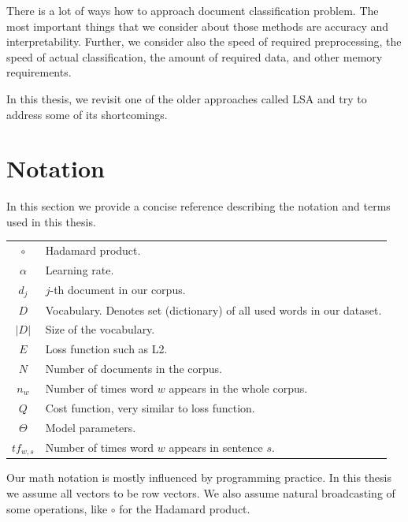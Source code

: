     There is a lot of ways how to approach document classification problem. 
    The most important things that we consider about those methods are accuracy and interpretability.
    Further, we consider also the speed of required preprocessing, the speed of actual classification, the amount of required data, and other memory requirements. 
    
    In this thesis, we revisit one of the older approaches called LSA and try to address some of its shortcomings.
    

\section{Notation}

    In this section we provide a concise reference describing the notation and terms used in this thesis.
    
    \begin{table}[h]
        \centering
        \begin{tabular}{c l}
            $\circ$ & Hadamard product. \\
            $\alpha$ & Learning rate. \\
            $d_j$ & $j$-th document in our corpus.\\
            $D$ & Vocabulary. Denotes set (dictionary) of all used words in our dataset. \\
            $|D|$ & Size of the vocabulary. \\
            $E$ & Loss function such as L2.\\
            $N$ & Number of documents in the corpus. \\
            $n_w$ & Number of times word $w$ appears in the whole corpus. \\
            $Q$ & Cost function, very similar to loss function.\\
            $\Theta$ & Model parameters.\\
            $tf_{w,s}$ & Number of times word $w$ appears in sentence $s$. \\
            
        \end{tabular}
    \end{table}
    
    Our math notation is mostly influenced by programming practice.
    In this thesis we assume all vectors to be row vectors.
    We also assume natural broadcasting of some operations, like $\circ$ for the Hadamard product.
    
